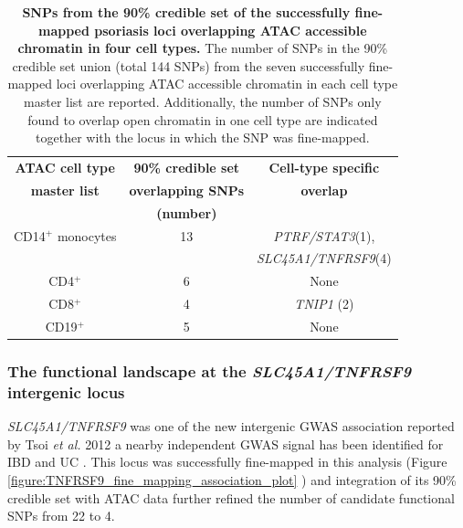 \begin{table}[htbp]
\centering
\begin{tabular}{@{} c c c}
\toprule
\textbf{ATAC cell type} & \textbf{90\% credible set}   &  \textbf{Cell-type specific}  \\
\textbf{master list}    & \textbf{overlapping SNPs}    &   \textbf{overlap}   \\
									      &	\textbf{(number)}				     &                            \\
\midrule
\midrule
 CD14$^+$ monocytes    & 13                            &  \textit{PTRF/STAT3}(1),\\ 
                       &                               &  \textit{SLC45A1/TNFRSF9}(4)\\
 CD4$^+$              & 6                             &  None \\
 CD8$^+$              & 4                             &  \textit{TNIP1} (2)        \\
 CD19$^+$              & 5                            &  None     \\
\bottomrule
\end{tabular}
\medskip %
\caption[SNPs from the 90\% credible set of the successfully fine-mapped psoriasis loci overlapping ATAC accessible chromatin in four cell types.]{\textbf{SNPs from the 90\% credible set of the successfully fine-mapped psoriasis loci overlapping ATAC accessible chromatin in four cell types.} The number of SNPs in the 90\% credible set union (total 144 SNPs) from the seven successfully fine-mapped loci overlapping ATAC accessible chromatin in each cell type master list are reported. Additionally, the number of SNPs only found to overlap open chromatin in one cell type are indicated together with the locus in which the SNP was fine-mapped.}
\label{tab:Psoriasis_fine_mapping_ATAC_overlap}
\end{table}
 

\subsubsection{The functional landscape at the \textit{SLC45A1/TNFRSF9} intergenic locus}

\textit{SLC45A1/TNFRSF9} was one of the new intergenic GWAS association reported by Tsoi \textit{et al.} 2012 a nearby independent GWAS signal has been identified for IBD and UC \parencite{Jostins2012,Anderson2011}. This locus was successfully fine-mapped in this analysis (Figure \ref{figure:TNFRSF9_fine_mapping_association_plot} ) and integration of its 90\% credible set with ATAC data further refined the number of candidate functional SNPs from 22 to 4. 



